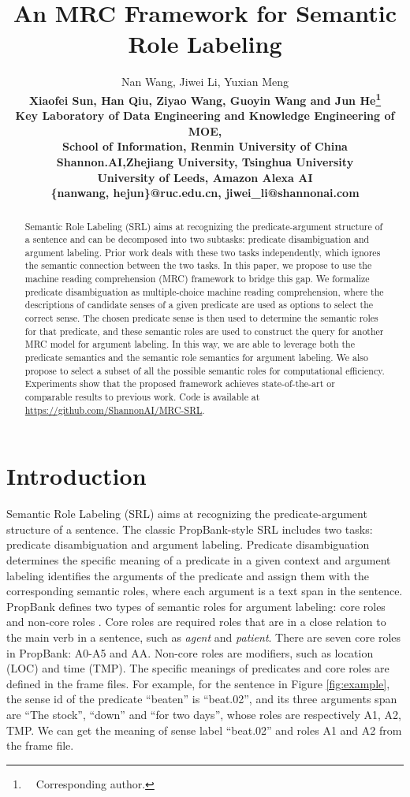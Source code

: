\documentclass[11pt]{article}
\title{An MRC Framework for Semantic Role Labeling}
\author{
Nan Wang, Jiwei Li, Yuxian Meng\\
\bf Xiaofei Sun, Han Qiu, Ziyao Wang, Guoyin Wang and Jun He\thanks{~~Corresponding author.} \\
Key Laboratory of Data Engineering and Knowledge Engineering of MOE, \\
School of Information, Renmin University of China\\
Shannon.AI,Zhejiang University, Tsinghua University \\
University of Leeds, Amazon Alexa AI \\
\{nanwang, hejun\}@ruc.edu.cn, jiwei\_li@shannonai.com
}
\begin{document}
\maketitle
\begin{abstract}
Semantic Role Labeling (SRL) aims at recognizing the predicate-argument structure of a sentence and can be decomposed into two subtasks: predicate disambiguation and argument labeling. 
Prior work deals with these two tasks independently, which ignores the semantic connection between the two tasks.
In this paper, we propose to use the machine reading comprehension (MRC) framework to bridge this gap.
We formalize predicate disambiguation as multiple-choice machine reading comprehension, where the descriptions of candidate senses of a given predicate are used as options to select the correct sense.
The chosen predicate sense is then used to determine the semantic roles for that predicate, and these semantic roles are used to construct the query for another MRC model for argument labeling.
In this way, we are able to leverage both the predicate semantics and the semantic role semantics for argument labeling.
We also propose to select a subset of all the possible semantic roles for computational efficiency.
Experiments show that the proposed framework achieves state-of-the-art or comparable results to previous work.
Code is available at \url{https://github.com/ShannonAI/MRC-SRL}.
\end{abstract}

\section{Introduction}
Semantic Role Labeling (SRL) aims at recognizing the predicate-argument structure of a sentence.  
The classic PropBank-style SRL includes two tasks: predicate disambiguation and argument labeling.
Predicate disambiguation determines the specific meaning of a predicate in a given context and argument labeling identifies the arguments of the predicate and assign them with the corresponding semantic roles, where each argument is a text span in the sentence.
PropBank defines two types of semantic roles for argument labeling: core roles and non-core roles \cite{bonial2010propbank}. Core roles are required roles that are in a close relation to the main verb in a sentence, such as {\it agent} and {\it patient}. 
There are seven core roles in PropBank: A0-A5 and AA.
Non-core roles are modifiers, such as location (LOC) and time (TMP). The specific meanings of predicates and core roles are defined in the frame files.
For example, for the sentence in Figure  \ref{fig:example}, the sense id of the predicate ``beaten'' is ``beat.02'', and its three arguments span are “The stock”, “down” and “for two days”, whose roles are respectively A1, A2, TMP.
We can get the meaning of sense label ``beat.02'' and roles A1 and A2 from the frame file.
\end{document}
